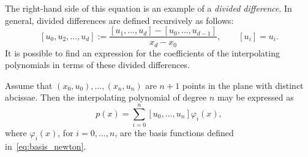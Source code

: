 The right-hand side of this equation is an example of a \emph{divided difference}.
In general, divided differences are defined recursively as follows:
\[
    [u_{0}, u_{2}, \dotsc, u_{d}] := \frac{[u_{1}, \dotsc, u_{d}] - [u_{0}, \dotsc, u_{d-1}]}{x_{d}-x_{0}}, \qquad [u_i] = u_i.
\]
It is possible to find an expression for the coefficients of the interpolating polynomials in terms of these divided differences.
\begin{proposition}
    Assume that $(x_0, u_0), \dotsc, (x_n, u_n)$ are $n+1$ points in the plane with distinct abcissae.
    Then the interpolating polynomial of degree $n$ may be expressed as
    \[
        p(x) = \sum_{i=0}^{n} [u_0, \dotsc, u_n] \varphi_i(x),
    \]
    where $\varphi_i(x)$, for $i = 0, \dotsc, n$, are the basis functions defined in~\eqref{eq:basis_newton}.
\end{proposition}
